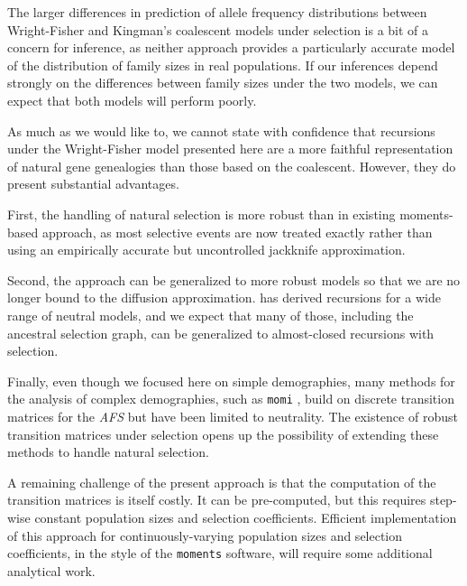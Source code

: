 \documentclass[9pt,twocolumn,twoside,lineno]{gsajnl}
\begin{document}
The larger differences in prediction of allele frequency distributions between Wright-Fisher and Kingman's 
coalescent models under selection is a bit of a concern for inference, as neither approach provides 
a particularly accurate model of the distribution of family sizes in real populations.
If our inferences depend strongly on the differences between family sizes under the two models, 
we can expect that both models will perform poorly. 

As much as we would like to, we cannot state with confidence that recursions under the Wright-Fisher
model presented here are a more faithful representation of natural gene genealogies than those based on 
the coalescent. However, they do present substantial advantages. 

First, the handling of natural selection is more robust than in existing moments-based approach, as most selective
events are now treated exactly rather than using an empirically accurate but uncontrolled jackknife approximation. 

Second, the approach can be generalized to more robust models so that we are no longer bound to the diffusion approximation. 
\cite{Lessard2010} has derived recursions for a wide range of neutral models, and we expect that many of those,
including the ancestral selection graph, can be generalized to almost-closed recursions with selection. 

Finally, even though we focused here on simple demographies, many methods for the analysis of complex demographies, 
such as \texttt{momi} \citep{KammEtAl2017}, build on discrete transition matrices for the \textit{AFS} but have been limited to neutrality.
 The existence of robust transition matrices 
under selection opens up the possibility of extending these methods to handle natural selection.

A remaining challenge of the present approach is that the computation of the transition matrices is itself costly. 
It can be pre-computed, but this requires step-wise constant population sizes 
and selection coefficients. Efficient implementation of this approach for continuously-varying population
sizes and selection coefficients, in the style of the \texttt{moments} software, will require some additional analytical work.


\end{document}

